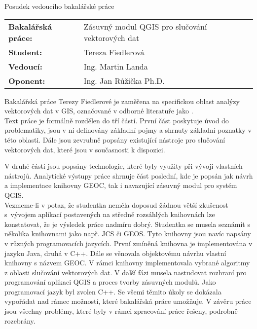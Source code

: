 \documentclass[czech,11pt,a4paper]{article}
\begin{document}
\begin{center}
  {\Large Posudek vedoucího bakalářské práce}
\end{center}

\vspace{.5cm}

\noindent \begin{tabular}{lp{}}
  {\bf Bakalářská práce:} &
  Zásuvný modul QGIS pro slučování vektorových dat \\
  {\bf Student:} & Tereza Fiedlerová \\
  {\bf Vedoucí:} & Ing. Martin Landa \\
  {\bf Oponent:} & Ing. Jan Růžička Ph.D. \\
\end{tabular}

\vspace{1cm}

Bakalářská práce Terezy Fiedlerové je zaměřena na specifickou oblast
analýzy vektorových dat v GIS, označované v odborné literatuře jako
.
\\

Text práce je formálně rozdělen do tří částí. První část poskytuje
úvod do problematiky, jsou v ní definovány základní pojmy a shrnuty
základní poznatky v této oblasti. Dále jsou zevrubně popsány
existující nástroje pro slučování vektorových dat, které jsou v
současnosti k dispozici.

V druhé části jsou popsány technologie, které byly využity při vývoji
vlastních nástrojů. Analytické výstupy práce shrnuje část poslední,
kde je popsán jak návrh a implementace knihovny GEOC, tak i navazující
zásuvný modul pro systém QGIS.
\\

Vezmeme-li v potaz, že studentka neměla doposud žádnou větší zkušenost
s~vývojem aplikací postavených na středně rozsáhlých knihovnách lze
konstatovat, že je výsledek práce nadmíru dobrý. Studentka se musela
seznámit s několika knihovnami jako např. JCS či GEOS. Tyto knihovny
jsou navíc napsány v různých programovacích jazycích. První zmíněná
knihovna je implementována v jazyku Java, druhá v C++. Dále se
věnovala objektovému návrhu vlastní knihovny s názvem GEOC. V rámci
knihovny implementovala vybrané algo\-ritmy z oblasti slučování
vektorových dat. V další fázi musela nastudovat rozhraní pro
programování aplikaci QGIS a proces tvorby zásuvných modulů. Jako
programovací jazyk byl zvolen C++. Se všemi těmito úkoly se dokázala
vypořádat nad rámec možností, které bakalářská práce umožňuje. V
závěru práce jsou všechny problémy, které byly v rámci zpracování
práce řešeny, podrobně rozebrány.
\\
\end{document}
